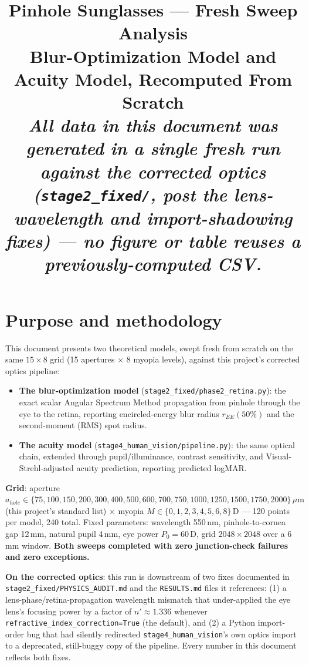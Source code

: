\documentclass[10.5pt]{report}
\title{\textbf{\Large Pinhole Sunglasses --- Fresh Sweep Analysis}\\[0.2cm]
\textcolor{hbblue}{\large Blur-Optimization Model and Acuity Model, Recomputed From Scratch}\\[0.3cm]
\normalsize\itshape All data in this document was generated in a single fresh run against
the corrected optics (\texttt{stage2\_fixed/}, post the lens-wavelength and
import-shadowing fixes) --- no figure or table reuses a previously-computed CSV.}
\author{}
\date{}
\begin{document}
\maketitle
\tableofcontents

\chapter{Purpose and methodology}

This document presents two theoretical models, swept fresh from scratch on the same
$15 \times 8$ grid (15 apertures $\times$ 8 myopia levels), against this project's
corrected optics pipeline:

\begin{itemize}
\item \textbf{The blur-optimization model} (\texttt{stage2\_fixed/phase2\_retina.py}):
  the exact scalar Angular Spectrum Method propagation from pinhole through the eye to
  the retina, reporting encircled-energy blur radius $r_{EE}(50\%)$ and the second-moment
  (RMS) spot radius.
\item \textbf{The acuity model} (\texttt{stage4\_human\_vision/pipeline.py}):
  the same optical chain, extended through pupil/illuminance, contrast sensitivity,
  and Visual-Strehl-adjusted acuity prediction, reporting predicted logMAR.
\end{itemize}

\textbf{Grid}: aperture $a_{hole} \in \{75, 100, 150, 200, 300, 400, 500, 600, 700, 750,
1000, 1250, 1500, 1750, 2000\}\,\mu\text{m}$ (this project's standard list) $\times$
myopia $M \in \{0, 1, 2, 3, 4, 5, 6, 8\}\,\text{D}$ --- 120 points per model, 240 total.
Fixed parameters: wavelength 550\,nm, pinhole-to-cornea gap 12\,mm, natural pupil
4\,mm, eye power $P_0=60$\,D, grid $2048\times2048$ over a 6\,mm window.
\textbf{Both sweeps completed with zero junction-check failures and zero exceptions.}

\textbf{On the corrected optics}: this run is downstream of two fixes documented in
\texttt{stage2\_fixed/PHYSICS\_AUDIT.md} and the \texttt{RESULTS.md} files it references:
(1) a lens-phase/retina-propagation wavelength mismatch that under-applied the eye
lens's focusing power by a factor of $n'\approx1.336$ whenever
\texttt{refractive\_index\_correction=True} (the default), and (2) a Python
import-order bug that had silently redirected \texttt{stage4\_human\_vision}'s own
optics import to a deprecated, still-buggy copy of the pipeline. Every number in this
document reflects both fixes.
\end{document}
